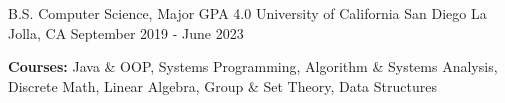
\begin{cventries}
  \cventry
    {B.S. Computer Science, Major GPA 4.0}
    {University of California San Diego}
    {La Jolla, CA}
    {September 2019 - June 2023}
    {
      \begin{cvitems}
        \item {\textbf{Courses:} Java \& OOP, Systems Programming, Algorithm \& Systems Analysis, Discrete Math, Linear Algebra, Group \& Set Theory, Data Structures}
      \end{cvitems}
    }
\end{cventries}
